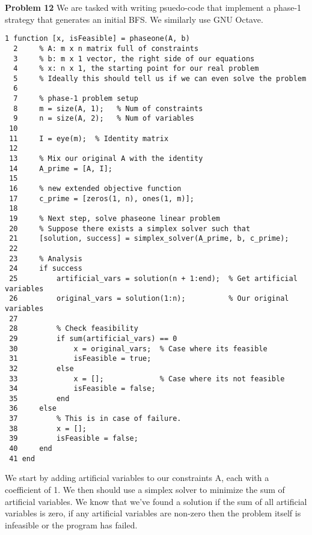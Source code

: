 \documentclass{article}
\begin{document}
\textbf{Problem 12} We are tasked with writing psuedo-code that implement a phase-1 strategy that generates an initial BFS. We similarly use GNU Octave. 
\begin{lstlisting}[style=cstyle]
  1 function [x, isFeasible] = phaseone(A, b)
  2     % A: m x n matrix full of constraints
  3     % b: m x 1 vector, the right side of our equations
  4     % x: n x 1, the starting point for our real problem                           
  5     % Ideally this should tell us if we can even solve the problem
  6       
  7     % phase-1 problem setup                   
  8     m = size(A, 1);   % Num of constraints    
  9     n = size(A, 2);   % Num of variables                     
 10  
 11     I = eye(m);  % Identity matrix                           
 12     
 13     % Mix our original A with the identity                            
 14     A_prime = [A, I];
 15     
 16     % new extended objective function                                            
 17     c_prime = [zeros(1, n), ones(1, m)];
 18     
 19     % Next step, solve phaseone linear problem
 20     % Suppose there exists a simplex solver such that
 21     [solution, success] = simplex_solver(A_prime, b, c_prime);
 22     
 23     % Analysis                  
 24     if success
 25         artificial_vars = solution(n + 1:end);  % Get artificial variables       
 26         original_vars = solution(1:n);          % Our original variables  
 27         
 28         % Check feasibility                                      
 29         if sum(artificial_vars) == 0
 30             x = original_vars;  % Case where its feasible      
 31             isFeasible = true;
 32         else
 33             x = [];             % Case where its not feasible
 34             isFeasible = false;
 35         end
 36     else   
 37         % This is in case of failure.                                   
 38         x = [];
 39         isFeasible = false;
 40     end
 41 end    
\end{lstlisting}
We start by adding artificial variables to our constraints A, each with a coefficient of 1. We then should use a simplex solver to minimize the sum of artificial variables. We know that we've found a solution if the sum of all artificial variables is zero, if any artificial variables are non-zero then the problem itself is infeasible or the program has failed.
\end{document}

